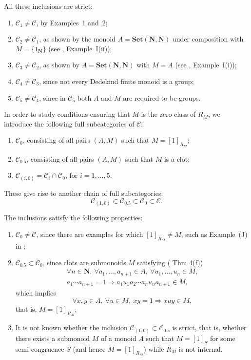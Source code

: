 \documentclass[12pt]{article}
\newcommand{\Set}{\mathbf{Set}}
\begin{document}
All these inclusions are strict:
\begin{enumerate}
\item $\mathcal{C}_1 \neq \mathcal{C}$, by Examples~1 and~2;
\item $\mathcal{C}_2 \neq \mathcal{C}_1$, as shown by the monoid $A=\Set(\mathbf{N},\mathbf{N})$ under composition with $M=\{1_{\mathbf{N}}\}$ (see \cite{MFS3}, Example~I(ii));
\item $\mathcal{C}_3 \neq \mathcal{C}_2$, as shown by $A=\Set(\mathbf{N},\mathbf{N})$ with $M=A$ (see \cite{MFS3}, Example~I(i));
\item $\mathcal{C}_4 \neq \mathcal{C}_3$, since not every Dedekind finite monoid is a group;
\item $\mathcal{C}_5 \neq \mathcal{C}_4$, since in $\mathcal{C}_5$ both $A$ and $M$ are required to be groups.
\end{enumerate}

In order to study conditions ensuring that $M$ is the zero-class of $R_M$, we introduce the following full subcategories of $\mathcal{C}$:
\begin{enumerate}
\item $\mathcal{C}_0$, consisting of all pairs $(A,M)$ such that $M=[1]_{R_M}$;
\item $\mathcal{C}_{0.5}$, consisting of all pairs $(A,M)$ such that $M$ is a clot;
\item $\mathcal{C}_{(i,0)}=\mathcal{C}_i\cap \mathcal{C}_0$, for $i=1,\dots,5$.
\end{enumerate}

These give rise to another chain of full subcategories:
\begin{equation}
\mathcal{C}_{(1,0)} \subset \mathcal{C}_{0.5} \subset \mathcal{C}_0 \subset \mathcal{C}.
\end{equation}

The inclusions satisfy the following properties:
\begin{enumerate}
\item $\mathcal{C}_0\neq\mathcal{C}$, since there are examples for which $[1]_{R_M}\neq M$, such as Example~(J) in \cite{MFS3};
\item $\mathcal{C}_{0.5}\subset \mathcal{C}_0$, since clots are submonoids $M$ satisfying (\cite{MFS3} Thm 4(f))
\begin{eqnarray}\label{eq: clot}
\forall n\in\mathbf{N},\ \forall a_1,\ldots,a_{n+1}\in A,\ \forall u_1,\ldots,u_n\in M,\nonumber\\
a_1\cdots a_{n+1}=1 \Rightarrow a_1u_1a_2\cdots a_nu_na_{n+1}\in M,
\end{eqnarray}
which implies
\begin{equation}\label{eq: M=[0]R_M}
\forall x,y\in A,\ \forall u\in M,\ xy=1 \Rightarrow xuy\in M,
\end{equation}
that is, $M=[1]_{R_M}$;
\item It is not known whether the inclusion $\mathcal{C}_{(1,0)}\subset \mathcal{C}_{0.5}$ is strict, that is, whether there exists a submonoid $M$ of a monoid $A$ such that
$M=[1]_S$ for some semi-congruence $S$ (and hence $M=[1]_{R_M}$) while $R_M$ is not internal.
\end{enumerate}
\end{document}
